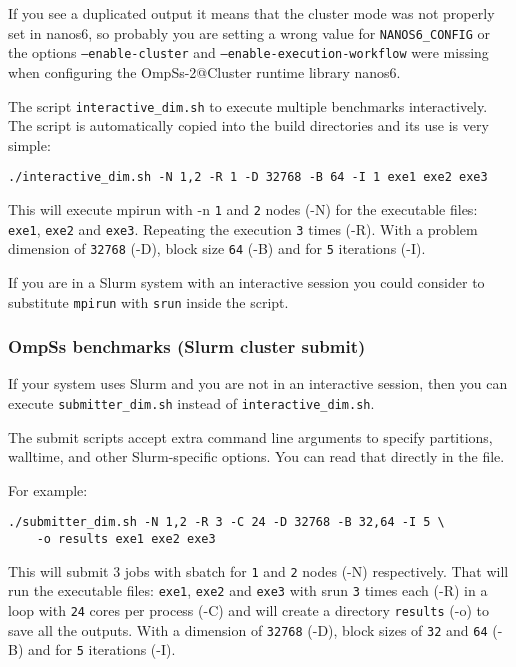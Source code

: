 \documentclass{article}
\newcommand{\code}[1]{\texttt{#1}}
\begin{document}
If you see a duplicated output it means that the cluster mode was not
properly set in nanos6, so probably you are setting a wrong value for
\code{NANOS6\_CONFIG} or the options \code{--enable-cluster} and
\code{--enable-execution-workflow} were missing when configuring the
OmpSs-2@Cluster runtime library nanos6.

The script \code{interactive\_dim.sh} to execute multiple benchmarks
interactively. The script is automatically copied into the build
directories and its use is very simple:

\begin{lstlisting}
./interactive_dim.sh -N 1,2 -R 1 -D 32768 -B 64 -I 1 exe1 exe2 exe3
\end{lstlisting}

This will execute mpirun with -n \code{1} and \code{2} nodes (-N) for
the executable files: \code{exe1}, \code{exe2} and
\code{exe3}. Repeating the execution \code{3} times (-R). With a
problem dimension of \code{32768} (-D), block size \code{64} (-B) and
for \code{5} iterations (-I).

If you are in a Slurm system with an interactive session you could
consider to substitute \code{mpirun} with \code{srun} inside the
script.

\subsubsection{OmpSs benchmarks (Slurm cluster submit)}

If your system uses Slurm and you are not in an interactive session,
then you can execute \code{submitter\_dim.sh} instead of
\code{interactive\_dim.sh}.

The submit scripts accept extra command line arguments to specify
partitions, walltime, and other Slurm-specific options. You can read
that directly in the file.

For example:

\begin{lstlisting}
./submitter_dim.sh -N 1,2 -R 3 -C 24 -D 32768 -B 32,64 -I 5 \
	-o results exe1 exe2 exe3
\end{lstlisting}

This will submit 3 jobs with sbatch for \code{1} and \code{2} nodes
(-N) respectively. That will run the executable files: \code{exe1},
\code{exe2} and \code{exe3} with srun \code{3} times each (-R) in a
loop with \code{24} cores per process (-C) and will create a directory
\code{results} (-o) to save all the outputs. With a dimension of
\code{32768} (-D), block sizes of \code{32} and \code{64} (-B) and for
\code{5} iterations (-I).
\end{document}
